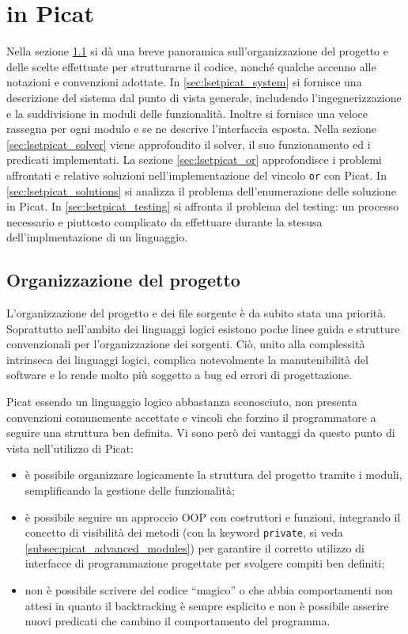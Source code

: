 \documentclass[12pt,a4paper,openright]{book} %
\begin{document}
\chapter{\lset{} in Picat}
\label{ch:lsetpicat}

\minitoc

Nella sezione \ref{sec:lsetpicat_project} si dà una breve panoramica
sull'organizzazione del progetto e delle scelte effettuate per
strutturarne il codice, nonché qualche accenno alle notazioni e
convenzioni adottate. In \ref{sec:lsetpicat_system} si fornisce una
descrizione del sistema dal punto di vista generale, includendo
l'ingegnerizzazione e la suddivisione in moduli delle
funzionalità. Inoltre si fornisce una veloce rassegna per ogni modulo
e se ne descrive l'interfaccia esposta. Nella sezione
\ref{sec:lsetpicat_solver} viene approfondito il solver, il suo
funzionamento ed i predicati implementati. La sezione
\ref{sec:lsetpicat_or} approfondisce i problemi affrontati e relative
soluzioni nell'implementazione del vincolo \texttt{or} con Picat. In
\ref{sec:lsetpicat_solutions} si analizza il problema
dell'enumerazione delle soluzione in Picat. In
\ref{sec:lsetpicat_testing} si affronta il problema del testing: un
processo necessario e piuttosto complicato da effettuare durante la
stesusa dell'implmentazione di un linguaggio.

\section{Organizzazione del progetto}
\label{sec:lsetpicat_project}

L'organizzazione del progetto e dei file sorgente è da subito stata
una priorità. Soprattutto nell'ambito dei linguaggi logici esistono
poche linee guida e strutture convenzionali per l'organizzazione dei
sorgenti. Ciò, unito alla complessità intrinseca dei linguaggi logici,
complica notevolmente la manutenibilità del software e lo rende molto
più soggetto a bug ed errori di progettazione.

Picat essendo un linguaggio logico abbastanza sconosciuto, non
presenta convenzioni comunemente accettate e vincoli che forzino il
programmatore a seguire una struttura ben definita. Vi sono però dei
vantaggi da questo punto di vista nell'utilizzo di Picat:
\begin{itemize}
	\item è possibile organizzare logicamente la struttura del
          progetto tramite i moduli, semplificando la gestione delle
          funzionalità;
	\item è possibile seguire un approccio OOP con costruttori e
          funzioni, integrando il concetto di visibilità dei metodi
          (con la keyword \texttt{private}, si veda
          \ref{subsec:picat_advanced_modules}) per garantire il corretto
          utilizzo di interfacce di programmazione progettate per
          svolgere compiti ben definiti;
	\item non è possibile scrivere del codice ``magico'' o che
          abbia comportamenti non attesi in quanto il backtracking è
          sempre esplicito e non è possibile asserire nuovi predicati
          che cambino il comportamento del programma.
\end{itemize}
\end{document}
